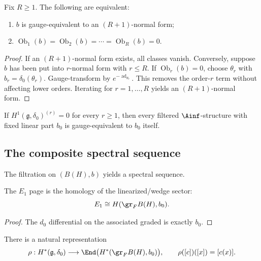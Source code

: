 \begin{theorem}
\label{thm:cbt-recursive-linearization}
\ClaimStatusProvedHere
Fix $R\ge1$. The following are equivalent:
\begin{enumerate}[label=\textup{(\roman*)},leftmargin=2em]
\item $b$ is gauge-equivalent to an $(R+1)$-normal form;
\item $\operatorname{Ob}_1(b)=\operatorname{Ob}_2(b)=\cdots=\operatorname{Ob}_R(b)=0$.
\end{enumerate}
\end{theorem}

\begin{proof}
If an $(R+1)$-normal form exists, all classes vanish. Conversely, suppose $b$ has been put into $r$-normal form with $r\le R$. If $\operatorname{Ob}_r(b)=0$, choose $\theta_r$ with $b_r=\delta_0(\theta_r)$. Gauge-transform by $e^{-\operatorname{ad}_{\theta_r}}$. This removes the order-$r$ term without affecting lower orders. Iterating for $r=1,\dots,R$ yields an $(R+1)$-normal form.
\end{proof}

\begin{corollary}
\label{cor:cbt-relative-formality}
\ClaimStatusProvedHere
If $H^1(\mathfrak g,\delta_0)^{(r)}=0$ for every $r\ge1$, then every filtered $\Ainf$-structure with fixed linear part $b_0$ is gauge-equivalent to $b_0$ itself.
\end{corollary}

\subsection{The composite spectral sequence}
\label{sec:cbt-composite-spectral}

The filtration on $(B(H),b)$ yields a spectral sequence.

\begin{proposition}
\label{prop:cbt-E1-page}
\ClaimStatusProvedHere
The $E_1$ page is the homology of the linearized/wedge sector:
\[
E_1\cong H(\gr_FB(H),b_0).
\]
\end{proposition}

\begin{proof}
The $d_0$ differential on the associated graded is exactly $b_0$.
\end{proof}

There is a natural representation
\[
\rho:H^\ast(\mathfrak g,\delta_0)\longrightarrow
\End\big(H^\ast(\gr_FB(H),b_0)\big),
\qquad
\rho([c])([x])=[c(x)].
\]


